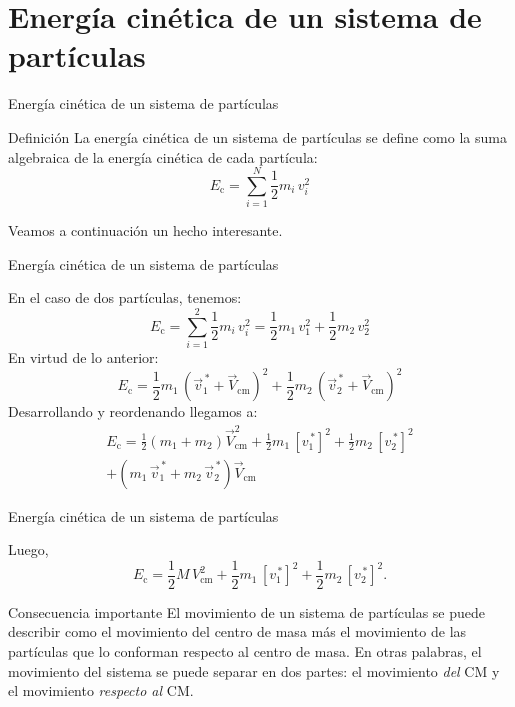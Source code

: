 \documentclass[11pt,handout,aspectratio=1610]{beamer}
\begin{document}
\section{Energía cinética de un sistema de partículas}

\begin{frame}{Energía cinética de un sistema de partículas}

    \begin{block}{Definición}
        La energía cinética de un sistema de partículas se define como la suma algebraica de la energía cinética de cada partícula: $$E_\text{c} = \sum_{i=1}^N \frac{1}{2} m_i \, v_i^2$$
    \end{block} \pause

    Veamos a continuación un hecho interesante.
    
\end{frame}

\begin{frame}{Energía cinética de un sistema de partículas}

    En el caso de dos partículas, tenemos:
    $$E_\text{c} = \sum_{i=1}^2 \frac{1}{2} m_i \, v_i^2 = \frac{1}{2} m_1 \, v_1^2 + \frac{1}{2} m_2 \, v_2^2$$ \pause En virtud de lo anterior:
    $$E_\text{c} = \frac{1}{2} m_1 \, \left(\vec{v}_1^{\,\ast} + \vec{V}_\text{cm}\right)^2 + \frac{1}{2} m_2 \, \left(\vec{v}_2^{\,\ast} + \vec{V}_\text{cm}\right)^2$$ \pause Desarrollando y reordenando llegamos a:
    \begin{multline*}
        E_\text{c} = \frac{1}{2} \left(m_1 + m_2\right) \vec{V}_\text{cm}^2 + \frac{1}{2} m_1 \, \left[v_1^{\,\ast}\right]^2 + \frac{1}{2} m_2 \, \left[v_2^{\,\ast}\right]^2 \\ + \left(m_1 \, \vec{v}_1^{\,\ast} + m_2 \, \vec{v}^{\,\ast}_2\right) \vec{V}_\text{cm}
    \end{multline*}

    
\end{frame}

\begin{frame}{Energía cinética de un sistema de partículas}

    Luego, $$E_\text{c} = \frac{1}{2} M \, V_\text{cm}^2 + \frac{1}{2} m_1 \, \left[v_1^{\,\ast}\right]^2 + \frac{1}{2} m_2 \, \left[v_2^{\,\ast}\right]^2.$$ \pause

    \begin{block}{Consecuencia importante}
        El movimiento de un sistema de partículas se puede describir como el movimiento del centro de masa más el movimiento de las partículas que lo conforman respecto al centro de masa. En otras palabras, el movimiento del sistema se puede separar en dos partes: el movimiento \emph{del} CM y el movimiento \emph{respecto al} CM.
    \end{block}

\end{frame}
\end{document}
